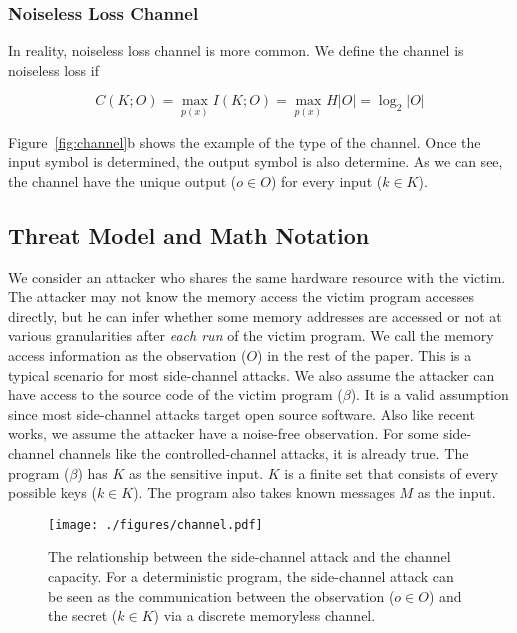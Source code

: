\subsubsection{Noiseless Loss Channel}
In reality, noiseless loss channel is more common. We define the channel is noiseless loss if

\begin{equation} \label{eq:2}
    C(K;O) = \max_{p(x)} I(K;O) = \max_{p(x)} H |O| = \log_2 {|O|}
\end{equation}

Figure~\ref{fig:channel}b  shows the example of the type of the channel. Once the input symbol is determined, the output symbol is also determine. As we can see, the channel have the unique output ($o \in O$) for every input ($k \in K$).



\subsection{Threat Model and Math Notation}


We consider an attacker who shares the same hardware resource with the victim. The attacker may not know the memory access the victim program accesses directly, but he can infer whether some memory addresses are accessed or not at various granularities after \textit{each run} of the victim program. We call the memory access information as the observation ($O$) in the rest of the paper. This is a typical scenario for most side-channel attacks.  We also assume the attacker can have access to the source code of the victim program ($\beta$). It is a valid assumption since most side-channel attacks target open source software. Also like recent works, we assume the attacker have a noise-free observation. For some side-channel channels like the controlled-channel attacks, it is already true. The program ($\beta$) has $K$ as the sensitive input. $K$ is a finite set that consists of every possible keys ($k \in K$). The program also takes known messages $M$ as the input. 

\begin{figure}[ht]
    \centering
    \texttt{[image: ./figures/channel.pdf]}
    \caption{The relationship between the side-channel attack and the channel capacity. For a deterministic program, the side-channel attack can be seen as the communication between the observation ($o \in O$) and the secret ($k \in K$) via a discrete memoryless channel.}
    \label{fig:side_channel}
\end{figure}

